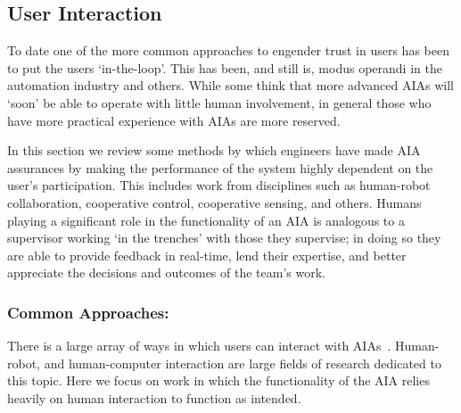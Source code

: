 \subsection{User Interaction} \label{sec:user_interaction}
To date one of the more common approaches to engender trust in users has been to put the users `in-the-loop'. This has been, and still is, modus operandi in the automation industry and others. While some think that more advanced AIAs will `soon' be able to operate with little human involvement, in general those who have more practical experience with AIAs are more reserved.

In this section we review some methods by which engineers have made AIA assurances by making the performance of the system highly dependent on the user's participation. This includes work from disciplines such as human-robot collaboration, cooperative control, cooperative sensing, and others. Humans playing a significant role in the functionality of an AIA is analogous to a supervisor working `in the trenches' with those they supervise; in doing so they are able to provide feedback in real-time, lend their expertise, and better appreciate the decisions and outcomes of the team's work.

\subsubsection{Common Approaches:}
There is a large array of ways in which users can interact with AIAs~\cite{Yanco2004-fh}. Human-robot, and human-computer interaction are large fields of research dedicated to this topic. Here we focus on work in which the functionality of the AIA relies heavily on human interaction to function as intended. 

